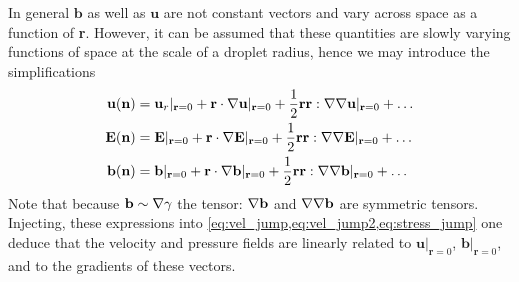 In general $\textbf{b}$ as well as $\textbf{u}$ are not constant vectors and vary across space as a function of \textbf{r}. 
However, it can be assumed that these quantities are slowly varying functions of space at the scale of a droplet radius, hence we may introduce the simplifications 
\begin{align*}
    \textbf{u}(\textbf{n}) 
    &=  \textbf{u}_r|_{\textbf{r}=0}
    +  \textbf{r} \cdot  \mathbf{\nabla}\textbf{u}|_{\textbf{r}=0}
    +  \frac{1}{2}\textbf{rr} :  \mathbf{\nabla}\mathbf{\nabla}\textbf{u}|_{\textbf{r}=0}
    + \ldots\\
     \textbf{E}(\textbf{n}) 
    &=   \textbf{E}|_{\textbf{r}=0}
    + \textbf{r} \cdot  \mathbf{\nabla} \textbf{E}|_{\textbf{r}=0}
    + \frac{1}{2}\textbf{rr} :  \mathbf{\nabla}\mathbf{\nabla} \textbf{E}|_{\textbf{r}=0}
    + \ldots\\
     \textbf{b}(\textbf{n}) 
    &=   \textbf{b}|_{\textbf{r}=0}
    + \textbf{r} \cdot  \mathbf{\nabla} \textbf{b}|_{\textbf{r}=0}
    + \frac{1}{2}\textbf{rr} :  \mathbf{\nabla}\mathbf{\nabla} \textbf{b}|_{\textbf{r}=0}
    + \ldots
\end{align*}
Note that because $\textbf{b} \sim \mathbf{\nabla} \gamma$ the tensor: $\mathbf{\nabla} \textbf{b}$ and $\mathbf{\nabla}\mathbf{\nabla} \textbf{b}$ are symmetric tensors. 
Injecting, these expressions into \ref{eq:vel_jump,eq:vel_jump2,eq:stress_jump} one deduce that the velocity and pressure fields are linearly related to $\textbf{u}|_{\textbf{r}=0}$, $\textbf{b}|_{\textbf{r}=0}$, and to the gradients of these vectors. 

